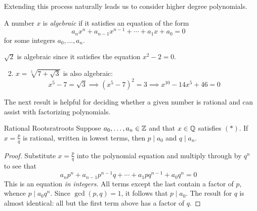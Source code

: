 Extending this process naturally leads us to consider higher degree polynomials.

\begin{defn}{}{}
	A number $x$ is \emph{algebraic} if it satisfies an equation of the form\footnotemark
	\[
		a_nx^n+a_{n-1}x^{n-1}+\cdots+a_1x+a_0=0\tag*{$(\ast)$}
	\]
	for some integers $a_0,\ldots,a_n$.
\end{defn}


\begin{examples}{}{}
	\exstart $\sqrt 2$ is algebraic since it satisfies the equation $x^2-2=0$.

	\begin{enumerate}\setcounter{enumi}{1}
	  \item $x=\sqrt[5]{7+\sqrt 3}$ is also algebraic:
	  \[
	  	x^5-7=\sqrt 3\implies (x^5-7)^2=3\implies x^{10}-14x^5+46=0
	  \]
	\end{enumerate}
\end{examples}


The next result is helpful for deciding whether a given number is rational and can assist with factorizing polynomials.

\begin{thm}{Rational Roots}{ratroots}
	Suppose $a_0,\ldots,a_n\in\mathbb{Z}$ and that $x\in\mathbb{Q}$ satisfies $(\ast)$. If $x=\frac pq$ is rational, written in lowest terms, then $p\mid a_0$ and $q\mid a_n$.
\end{thm}


\begin{proof}
	Substitute $x=\frac pq$ into the polynomial equation and multiply through by $q^n$ to see that
	\[
		a_np^n+a_{n-1}p^{n-1}q+\cdots+a_1pq^{n-1}+a_0q^n=0
	\]
	This is an equation \emph{in integers.} All terms except the last contain a factor of $p$, whence $p\mid a_0q^n$. Since $\gcd(p,q)=1$, it follows that $p\mid a_0$. The result for $q$ is almost identical: all but the first term above has a factor of $q$.
\end{proof}


\goodbreak


